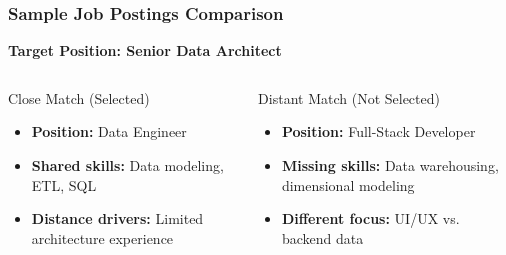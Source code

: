 \documentclass[aspectratio=169]{beamer}
\begin{document}
\begin{frame}
\frametitle{Sample Job Postings Comparison}

\begin{center}
\textbf{Target Position: Senior Data Architect}
\end{center}

\begin{columns}
\begin{column}{0.48\textwidth}
\begin{block}{Close Match (Selected)}
\begin{itemize}
\item \textbf{Position:} Data Engineer
\item \textbf{Shared skills:} Data modeling, ETL, SQL
\item \textbf{Distance drivers:} Limited architecture experience
\end{itemize}
\end{block}
\end{column}

\begin{column}{0.48\textwidth}
\begin{block}{Distant Match (Not Selected)}
\begin{itemize}
\item \textbf{Position:} Full-Stack Developer
\item \textbf{Missing skills:} Data warehousing, dimensional modeling
\item \textbf{Different focus:} UI/UX vs. backend data
\end{itemize}
\end{block}
\end{column}
\end{columns}
\end{frame}
\end{document}
